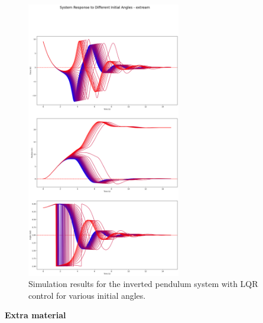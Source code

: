 \documentclass[a4 paper]{article}
\begin{document}
\begin{figure}[H]
    \centering
    \includegraphics[width=0.6\textwidth]{./figs/Different_initial_positions_extream.png}
    \caption{Simulation results for the inverted pendulum system with LQR control for various initial angles.}
\end{figure}









\newpage
\textbf{\huge{Extra material}}
\end{document}
